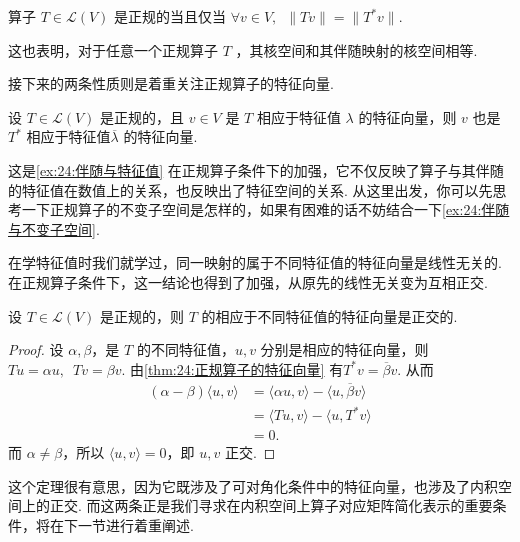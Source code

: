 \begin{theorem} \label{thm:24:正规算子的等价条件}
    算子 $ T \in \mathcal{L}(V) $ 是正规的当且仅当 $ \forall v \in V,\enspace \lVert Tv \rVert = \lVert T^*v \rVert $.
\end{theorem}

这也表明，对于任意一个正规算子 $ T $ ，其核空间和其伴随映射的核空间相等.

接下来的两条性质则是着重关注正规算子的特征向量.

\begin{theorem} \label{thm:24:正规算子的特征向量}
    设 $ T \in \mathcal{L}(V) $ 是正规的，且 $ v \in V $ 是 $ T $ 相应于特征值 $ \lambda $ 的特征向量，则 $ v $ 也是 $ T^* $ 相应于特征值$ \overline{\lambda} $ 的特征向量.
\end{theorem}

这是\autoref{ex:24:伴随与特征值} 在正规算子条件下的加强，它不仅反映了算子与其伴随的特征值在数值上的关系，也反映出了特征空间的关系. 从这里出发，你可以先思考一下正规算子的不变子空间是怎样的，如果有困难的话不妨结合一下\autoref{ex:24:伴随与不变子空间}.

在学特征值时我们就学过，同一映射的属于不同特征值的特征向量是线性无关的. 在正规算子条件下，这一结论也得到了加强，从原先的线性无关变为互相正交.

\begin{theorem} \label{thm:24:正规算子的特征向量正交}
    设 $ T \in \mathcal{L}(V) $ 是正规的，则 $ T $ 的相应于不同特征值的特征向量是正交的.
\end{theorem}

\begin{proof}
    设 $ \alpha, \beta $，是 $ T $ 的不同特征值，$ u, v $ 分别是相应的特征向量，则 $ Tu = \alpha u,\enspace Tv = \beta v $. 由\autoref{thm:24:正规算子的特征向量} 有$ T^*v = \overline{\beta} v $. 从而
    \begin{align*}
        (\alpha - \beta)\langle u, v \rangle
         & = \langle \alpha u, v \rangle - \langle u, \overline{\beta}v \rangle \\
         & = \langle Tu, v \rangle - \langle u, T^*v \rangle                    \\
         & = 0.
    \end{align*}
    而 $ \alpha \neq \beta $，所以 $ \langle u, v \rangle = 0 $，即 $ u, v $ 正交.
\end{proof}

这个定理很有意思，因为它既涉及了可对角化条件中的特征向量，也涉及了内积空间上的正交. 而这两条正是我们寻求在内积空间上算子对应矩阵简化表示的重要条件，将在下一节进行着重阐述.

